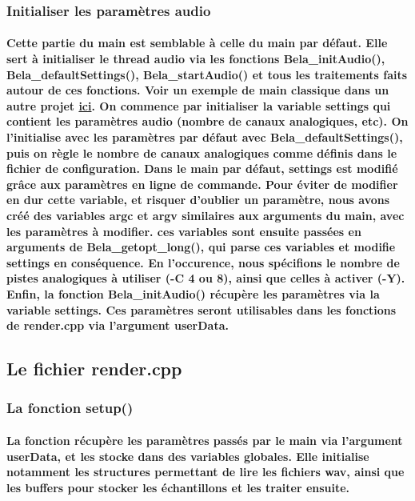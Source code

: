 \documentclass[a4paper]{article}
\begin{document}
\subsubsection{Initialiser les paramètres audio} \paragraph{Cette partie du main
est semblable à celle du main par défaut. Elle sert à initialiser le thread
audio via les fonctions Bela\_initAudio(), Bela\_defaultSettings(),
Bela\_startAudio() et tous les traitements faits autour de ces fonctions. Voir
un exemple de main classique dans un autre projet
\href{https://github.com/BelaPlatform/Bela/blob/master/examples/07-DataLogging/logging-sensors/main.cpp}{ici}.
On commence par initialiser la variable settings qui contient les paramètres
audio (nombre de canaux analogiques, etc). On l’initialise avec les paramètres
par défaut avec Bela\_defaultSettings(), puis on règle le nombre de canaux
analogiques comme définis dans le fichier de configuration. Dans le main par
défaut, settings est modifié grâce aux paramètres en ligne de commande. Pour
éviter de modifier en dur cette variable, et risquer d’oublier un paramètre,
nous avons créé des variables argc et argv similaires aux arguments du main,
avec les paramètres à modifier. ces variables sont ensuite passées en arguments
de Bela\_getopt\_long(), qui parse ces variables et modifie settings en
conséquence. En l’occurence, nous spécifions le nombre de pistes analogiques à
utiliser (-C 4 ou 8), ainsi que celles à activer (-Y). Enfin, la fonction
Bela\_initAudio() récupère les paramètres via la variable settings. Ces
paramètres seront utilisables dans les fonctions de render.cpp via l’argument
userData.}

\subsection{Le fichier render.cpp}

\subsubsection{La fonction setup()} \paragraph{La fonction récupère les
paramètres passés par le main via l’argument userData, et les stocke dans des
variables globales. Elle initialise notamment les structures permettant de lire
les fichiers wav, ainsi que les buffers pour stocker les échantillons et les
traiter ensuite.}
\end{document}

